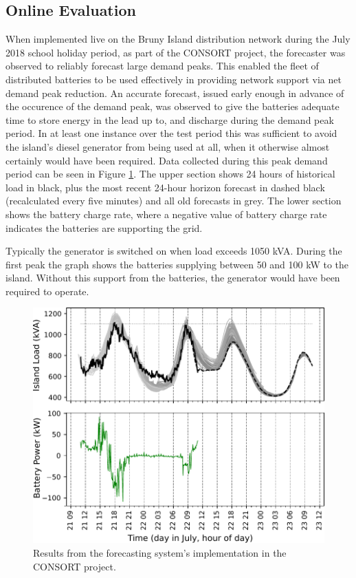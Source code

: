 \subsection{Online Evaluation}
When implemented live on the Bruny Island distribution network during the July 2018 school holiday period, as part of the CONSORT project, the forecaster was observed to reliably forecast large demand peaks.
This enabled the fleet of distributed batteries to be used effectively in providing network support via net demand peak reduction. An accurate forecast, issued early enough in advance of the occurence of the demand peak, was observed to give the batteries adequate time to store energy in the lead up to, and discharge during the demand peak period. In at least one instance over the test period this was sufficient to avoid the island's diesel generator from being used at all, when it otherwise almost certainly would have been required.
Data collected during this peak demand period can be seen in Figure \ref{fig:bruny_nac}.
The upper section shows 24 hours of historical load in black, plus the most recent 24-hour horizon forecast in dashed black (recalculated every five minutes) and all old forecasts in grey.
The lower section shows the battery charge rate, where a negative value of battery charge rate indicates the batteries are supporting the grid.

Typically the generator is switched on when load exceeds 1050 kVA.
During the first peak the graph shows the batteries supplying between 50 and 100 kW to the island.
Without this support from the batteries, the generator would have been required to operate.

\begin{figure}[htbp]
	\centerline{\includegraphics[width=.35\textwidth]{images/bruny_nac.pdf}}
	\caption{Results from the forecasting system's implementation in the CONSORT project.}
	\label{fig:bruny_nac}
\end{figure}



